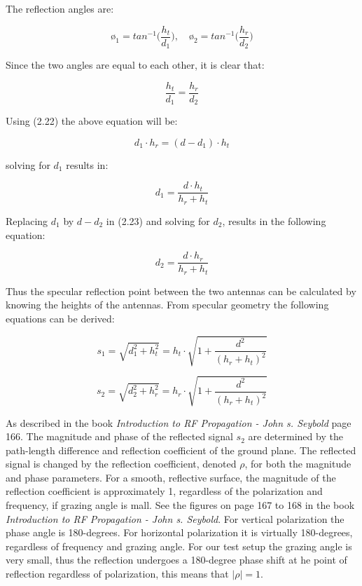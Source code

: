The reflection angles are:

$$ø_1 = tan^{-1}\Big(\frac{h_t}{d_1}\Big), \quad ø_2 = tan^{-1}\Big(\frac{h_r}{d_2}\Big)$$

Since the two angles are equal to each other, it is clear that: 

$$\frac{h_t}{d_1} = \frac{h_r}{d_2}$$

Using (2.22) the above equation will be:

\begin{equation}
  d_1 \cdot h_r = (d-d_1) \cdot h_t
\end{equation}

solving for $d_1$ results in:

\begin{equation}
  d_1 = \frac{d \cdot h_t}{h_r + h_t}
\end{equation}

Replacing $d_1$ by $d - d_2$ in (2.23) and solving for $d_2$, results in the following equation:

\begin{equation}
  d_2 = \frac{d \cdot h_r}{h_r + h_t}
\end{equation}

Thus the specular reflection point between the two antennas can be calculated by knowing the heights of the antennas. From specular geometry the following equations can be derived: 

\begin{equation}
  s_1 = \sqrt{d_1^2 + h_t^2} = h_t \cdot \sqrt{1 + \frac{d^2}{(h_r + h_t)^2}}
\end{equation}

\begin{equation}
  s_2 = \sqrt{d_2^2 + h_r^2} = h_r \cdot \sqrt{1 + \frac{d^2}{(h_r + h_t)^2}}
\end{equation}

As described in the book \textit{Introduction to RF Propagation - John s. Seybold}\cite{RFpropagation} page 166. The magnitude and phase of the reflected signal $s_2$ are determined by the path-length difference and reflection coefficient of the ground plane. The reflected signal is changed by the reflection coefficient, denoted $\rho$, for both the magnitude and phase parameters. For a smooth, reflective surface, the magnitude of the reflection coefficient is approximately 1, regardless of the polarization and frequency, if grazing angle is mall. See the figures on page 167 to 168 in the book \textit{Introduction to RF Propagation - John s. Seybold}\cite{RFpropagation}. For vertical polarization the phase angle is 180-degrees. For horizontal polarization it is virtually 180-degrees, regardless of frequency and grazing angle. For our test setup the grazing angle is very small, thus the reflection undergoes a 180-degree phase shift at he point of reflection regardless of polarization, this means that $|\rho| = 1$.

